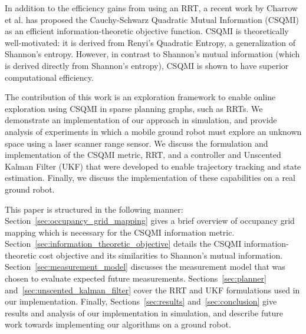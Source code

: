 In addition to the efficiency gains from using an RRT, a recent work by Charrow
et al. \cite{charrow15} has
proposed the Cauchy-Schwarz Quadratic Mutual Information (CSQMI) as an efficient
information-theoretic objective function. CSQMI is theoretically
well-motivated: it is derived from Renyi's Quadratic Entropy, a generalization of Shannon's entropy.
However, in contrast to Shannon's mutual information (which is derived directly
from Shannon's entropy), CSQMI is shown to have superior computational efficiency.

The contribution of this work is an exploration framework to enable online exploration using CSQMI in sparse
planning graphs, such as RRTs. We demonstrate an implementation of our approach
in simulation, and provide analysis of experiments in which a mobile ground
robot must explore an unknown space using a laser scanner range sensor. We discuss the
formulation and implementation of the CSQMI metric, RRT, and a controller and
Unscented Kalman Filter (UKF) that were developed to enable trajectory tracking and
state estimation. Finally, we discuss the implementation of these capabilities
on a real ground robot.

This paper is structured in the following manner: Section~\ref{sec:occupancy_grid_mapping}
gives a brief overview of occupancy grid mapping which is necessary for the CSQMI
information metric. Section~\ref{sec:information_theoretic_objective}
details the CSQMI information-theoretic cost objective and its similarities to
Shannon's mutual information. Section~\ref{sec:measurement_model} discusses the
measurement model that was chosen to evaluate expected future measurements.
Sections~\ref{sec:planner} and~\ref{sec:unscented_kalman_filter} cover the RRT and UKF formulations
used in our implementation. Finally, Sections~\ref{sec:results}
and~\ref{sec:conclusion} give results and analysis of our implementation in
simulation, and describe future work towards implementing our algorithms on a
ground robot.
